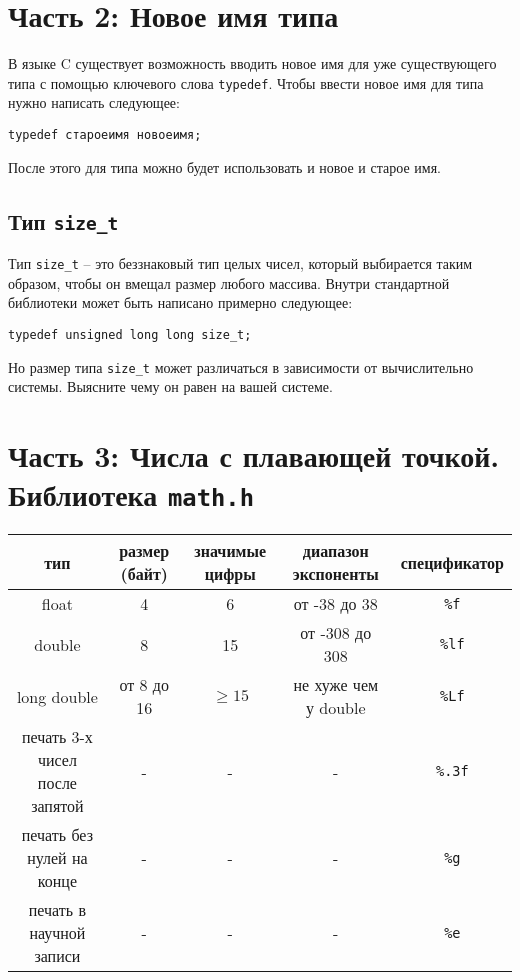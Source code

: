 \documentclass[10pt]{article}
\begin{document}
\section*{Часть 2: Новое имя типа}
В языке C существует возможность вводить новое имя для уже существующего типа с помощью ключевого слова \texttt{typedef}. Чтобы ввести новое имя для типа нужно написать следующее:
\begin{lstlisting}
typedef староеимя новоеимя;
\end{lstlisting}
После этого для типа можно будет использовать и новое и старое имя.


\subsection*{Тип \texttt{size\_t}} 
Тип \texttt{size\_t} -- это беззнаковый тип целых чисел, который выбирается таким образом, чтобы он вмещал размер любого массива. Внутри стандартной библиотеки может быть написано примерно следующее:
\begin{lstlisting}
typedef unsigned long long size_t;
\end{lstlisting}
Но размер типа \texttt{size\_t} может различаться в зависимости от вычислительно системы. Выясните чему он равен на вашей системе.

\newpage
\section*{Часть 3: Числа с плавающей точкой. Библиотека \texttt{math.h}}
\begin{center}
\begin{tabular}{ c c c c c }
 тип & размер (байт) & значимые цифры & диапазон экспоненты & спецификатор \\ \hline
 float             & 4          & 6  & от -38 до 38    & \texttt{\%f} \\ 
 double            & 8          & 15 & от -308 до 308  & \texttt{\%lf}  \\  
 long double       & от 8 до 16 & $\ge 15$  & не хуже чем у double  & \texttt{\%Lf}  \\ \hline
 печать 3-х чисел после запятой & -          & -  & -              & \texttt{\%.3f} \\
 печать без нулей на конце & -          & -  & -              & \texttt{\%g} \\
 печать в научной записи   & -          & -  & -              & \texttt{\%e} \\
\end{tabular}
\end{center}
\end{document}
